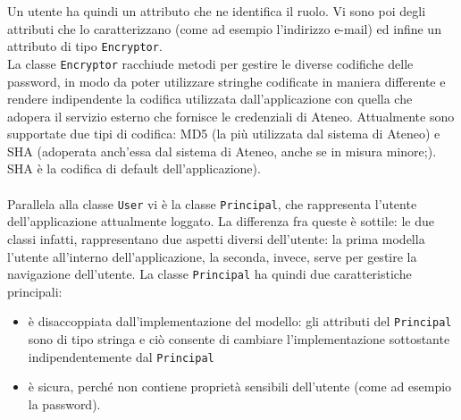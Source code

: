 Un utente ha quindi un attributo che ne identifica il ruolo. Vi sono poi degli attributi che lo caratterizzano (come ad esempio l'indirizzo e-mail) ed infine un attributo di tipo \texttt{Encryptor}. \\
La classe \texttt{Encryptor} racchiude metodi per gestire le diverse codifiche delle password, in modo da poter utilizzare stringhe codificate in maniera differente e rendere indipendente la codifica utilizzata dall'applicazione 
con quella che adopera il servizio esterno che fornisce le credenziali di Ateneo. Attualmente sono supportate due tipi di codifica: MD5 (la più utilizzata dal sistema di Ateneo) e 
SHA (adoperata anch'essa dal sistema di Ateneo, anche se in misura minore;). SHA è la codifica di default dell'applicazione).\\
\\

Parallela alla classe \texttt{User} vi è la classe \texttt{Principal}, che rappresenta l'utente dell'applicazione attualmente loggato. 
La differenza fra queste è sottile: le due classi infatti, rappresentano due aspetti diversi dell'utente: la prima modella l'utente all'interno dell'applicazione, la seconda, invece, serve per gestire la navigazione dell'utente. La classe \texttt{Principal} ha quindi due caratteristiche principali:
\begin{itemize}
\item è disaccoppiata dall'implementazione del modello: gli attributi del \texttt{Principal} sono di tipo stringa e ciò consente di cambiare l'implementazione sottostante indipendentemente dal \texttt{Principal}
\item è sicura, perché non contiene proprietà sensibili dell'utente (come ad esempio la password).
\end{itemize}



